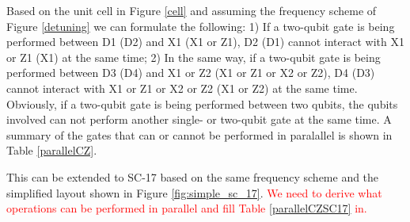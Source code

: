 \documentclass[11pt]{article}
\begin{document}
Based on the unit cell in Figure \ref{cell} and assuming the frequency scheme of Figure \ref{detuning} we can formulate the following: 1) If a two-qubit gate is being performed between D1 (D2) and X1 (X1 or Z1), D2 (D1) cannot interact with X1 or Z1 (X1) at the same time; 2) In the same way, if a two-qubit gate is being performed between D3 (D4) and X1 or Z2 (X1 or Z1 or X2 or Z2), D4 (D3) cannot interact with X1 or Z1 or X2 or Z2 (X1 or Z2) at the same time. Obviously,  if a two-qubit gate is being performed between two qubits, the qubits involved can not perform another single- or two-qubit gate at the same time. A summary of the gates that can or cannot be performed in paralallel is shown in Table \ref{parallelCZ}.

\begin{table}[h!]
\centering
\caption{Allowed and not allowed parallel CZ gates in the unit cell.}
\label{parallelCZ}
\small
{}
\end{table}


This can be extended to SC-17 based on the same frequency scheme and the simplified layout shown in Figure \ref{fig:simple_sc_17}. \textcolor{red}{We need to derive what operations can be performed in parallel and fill Table \ref{parallelCZSC17} in.}
\end{document}

